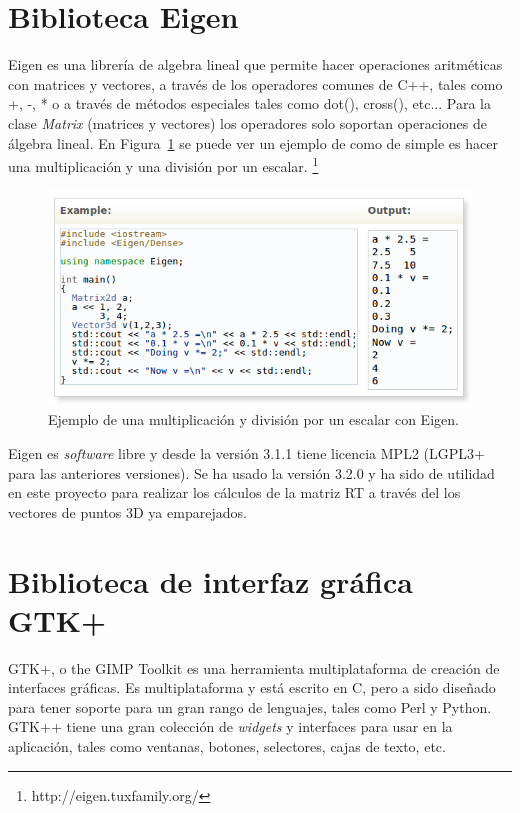 \section{Biblioteca Eigen}
Eigen es una librería de algebra lineal que permite hacer operaciones aritméticas con matrices y vectores, a través de los operadores comunes de C++, tales como +, -, * o a través de métodos especiales tales como dot(), cross(), etc... Para la clase \textit{Matrix} (matrices y vectores) los operadores solo soportan operaciones de álgebra lineal. En Figura~\ref{fig:Eigen} se puede ver un ejemplo de como de simple es hacer una multiplicación y una división por un escalar. \footnote{http://eigen.tuxfamily.org/}

\begin{figure}[th]
\centering
\includegraphics[scale=0.65]{Figures/eigen-multiplication.png}
\decoRule
\caption[eigen]{Ejemplo de una multiplicación y división por un escalar con Eigen.}
\label{fig:Eigen}
\end{figure}

Eigen es \textit{software} libre y desde la versión 3.1.1 tiene licencia MPL2 (LGPL3+ para las anteriores versiones). Se ha usado la versión 3.2.0 y ha sido de utilidad en este proyecto para realizar los cálculos de la matriz RT a través del los vectores de puntos 3D ya emparejados.

\section{Biblioteca de interfaz gráfica GTK+}
GTK+, o the GIMP Toolkit es una herramienta multiplataforma de creación de interfaces gráficas. Es multiplataforma y está escrito en C, pero a sido diseñado para tener soporte para un gran rango de lenguajes, tales como Perl y Python. GTK++ tiene una gran colección de \textit{widgets} y interfaces para usar en la aplicación, tales como ventanas, botones, selectores, cajas de texto, etc.

